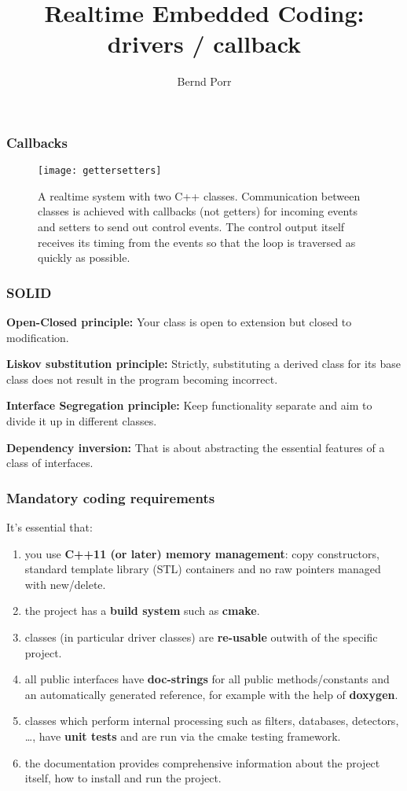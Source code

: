\documentclass[xcolor=dvipsnames]{beamer}
\title{Realtime Embedded Coding: drivers / callback}
\date{}
\author{Bernd Porr}
\begin{document}
\begin{frame}
\titlepage
\end{frame}

\begin{frame}[fragile]
\frametitle{Callbacks}
\begin{figure}[!hbt]
    \begin{center}
    \mbox{\texttt{[image: gettersetters]}}
    \end{center}
    A realtime system with two C++ classes. Communication
      between classes is achieved with callbacks (not getters) for incoming events
      and setters to send out control events. The control output itself
      receives its timing from the events so that the loop is traversed
      as quickly as possible.
    \end{figure}
\end{frame}


\begin{frame}[fragile]
    \frametitle{SOLID}

\textbf{Open-Closed principle:} Your class is open to extension but
closed to modification. 

\textbf{Liskov substitution principle:} Strictly, substituting
a derived class for its base class does not result in the program
becoming incorrect. 

\textbf{Interface Segregation principle:}
Keep functionality separate and aim to divide it up in different
classes. 

\textbf{Dependency inversion:} That is about abstracting the
essential features of a class of interfaces.

\end{frame}

\begin{frame}[fragile]
    \frametitle{Mandatory coding requirements}
    It's essential that:
\begin{enumerate}
\item you use \textbf{C++11 (or later) memory management}: copy constructors, standard template library (STL) containers and no raw pointers
  managed with new/delete.
\item the project has a \textbf{build system} such as \textbf{cmake}.
\item classes (in particular driver classes) are \textbf{re-usable}
  outwith of the specific project.
\item all public interfaces have \textbf{doc-strings} for all public
  methods/constants and an automatically generated reference, for
  example with the help of \textbf{doxygen}.
\item classes which perform internal processing such as filters,
  databases, detectors, \ldots, have \textbf{unit tests} and are run via
  the cmake testing framework.
\item the documentation provides comprehensive information about the project itself,
  how to install and run the project.
\end{enumerate}
\end{frame}
    
\end{document}
